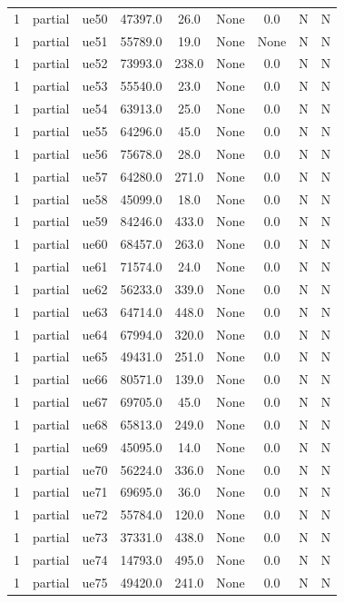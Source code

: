 \begin{table}[ht]
\begin{tabular}{|c|c|c|c|c|c|c|c|c|}
1 & partial & ue50 & 47397.0 & 26.0 & None & 0.0 & N & N \\
1 & partial & ue51 & 55789.0 & 19.0 & None & None & N & N \\
1 & partial & ue52 & 73993.0 & 238.0 & None & 0.0 & N & N \\
1 & partial & ue53 & 55540.0 & 23.0 & None & 0.0 & N & N \\
1 & partial & ue54 & 63913.0 & 25.0 & None & 0.0 & N & N \\
1 & partial & ue55 & 64296.0 & 45.0 & None & 0.0 & N & N \\
1 & partial & ue56 & 75678.0 & 28.0 & None & 0.0 & N & N \\
1 & partial & ue57 & 64280.0 & 271.0 & None & 0.0 & N & N \\
1 & partial & ue58 & 45099.0 & 18.0 & None & 0.0 & N & N \\
1 & partial & ue59 & 84246.0 & 433.0 & None & 0.0 & N & N \\
1 & partial & ue60 & 68457.0 & 263.0 & None & 0.0 & N & N \\
1 & partial & ue61 & 71574.0 & 24.0 & None & 0.0 & N & N \\
1 & partial & ue62 & 56233.0 & 339.0 & None & 0.0 & N & N \\
1 & partial & ue63 & 64714.0 & 448.0 & None & 0.0 & N & N \\
1 & partial & ue64 & 67994.0 & 320.0 & None & 0.0 & N & N \\
1 & partial & ue65 & 49431.0 & 251.0 & None & 0.0 & N & N \\
1 & partial & ue66 & 80571.0 & 139.0 & None & 0.0 & N & N \\
1 & partial & ue67 & 69705.0 & 45.0 & None & 0.0 & N & N \\
1 & partial & ue68 & 65813.0 & 249.0 & None & 0.0 & N & N \\
1 & partial & ue69 & 45095.0 & 14.0 & None & 0.0 & N & N \\
1 & partial & ue70 & 56224.0 & 336.0 & None & 0.0 & N & N \\
1 & partial & ue71 & 69695.0 & 36.0 & None & 0.0 & N & N \\
1 & partial & ue72 & 55784.0 & 120.0 & None & 0.0 & N & N \\
1 & partial & ue73 & 37331.0 & 438.0 & None & 0.0 & N & N \\
1 & partial & ue74 & 14793.0 & 495.0 & None & 0.0 & N & N \\
1 & partial & ue75 & 49420.0 & 241.0 & None & 0.0 & N & N \\

\end{tabular}
\end{table}
